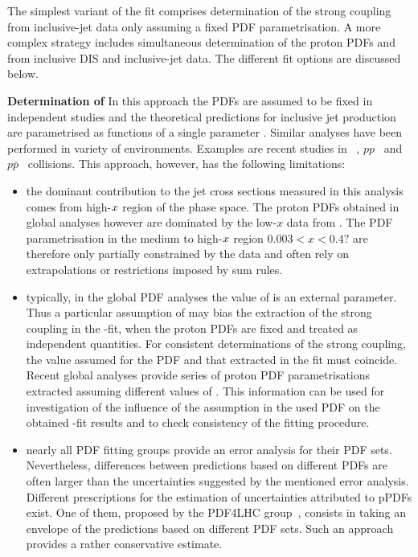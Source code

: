 The simplest variant of the fit comprises determination of the strong coupling \asz from inclusive-jet data only assuming a fixed PDF parametrisation. A more complex strategy includes simultaneous determination of the proton PDFs and \asz from inclusive DIS and inclusive-jet data. The different fit options are discussed below.
 
{\flushleft \textbf{Determination of \asz}}\newline
In this approach the PDFs are assumed to be fixed in independent studies and the theoretical predictions for inclusive jet production are parametrised as functions of a single parameter \asz. Similar analyses have been performed in variety of environments. Examples are recent studies in \ep~\cite{}, $pp$~\cite{} and $p\bar{p}$~\cite{} collisions. This approach, however, has the following limitations:
\begin{itemize}
 \item the dominant contribution to the jet cross sections measured in this analysis comes from high-$\mbox{${x}$}$ region of the phase space. The proton PDFs obtained in global analyses however are dominated by the low-$x$ data from \hera. The PDF parametrisation in the medium to high-$\mbox{${x}$}$ region $0.003<x<0.4?$ are therefore only partially constrained by the data and often rely on extrapolations or restrictions imposed by sum rules.
 \item typically, in the global PDF analyses the value of \asz is an external parameter. Thus a particular assumption of \asz may bias the extraction of the strong coupling in the \as-fit, when the proton PDFs are fixed and treated as independent quantities. For consistent determinations of the strong coupling, the value assumed for the PDF and that extracted in the fit must coincide. Recent global analyses provide series of proton PDF parametrisations extracted assuming different values of \asz. This information can be used for investigation of the influence of the \asz assumption in the used PDF on the obtained \as-fit results and to check consistency of the fitting procedure.
 \item nearly all PDF fitting groups provide an error analysis for their PDF sets. Nevertheless, differences between predictions based on different PDFs are often larger than the uncertainties suggested by the mentioned error analysis. Different prescriptions for the estimation of uncertainties attributed to pPDFs exist. One of them, proposed by the PDF4LHC group~\cite{pdf4lhc:2011}, consists in taking an envelope of the predictions based on different PDF sets. Such an approach provides a rather conservative estimate. 
\end{itemize}

